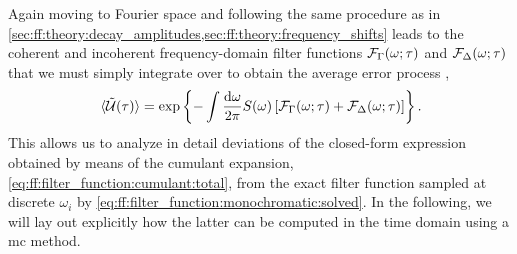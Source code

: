 Again moving to Fourier space and following the same procedure as in \cref{sec:ff:theory:decay_amplitudes,sec:ff:theory:frequency_shifts} leads to the coherent and incoherent frequency-domain filter functions $\mathcal{F}_{\Gamma}(\omega;\tau)$ and $\mathcal{F}_{\Delta}(\omega;\tau)$ that we must simply integrate over to obtain the average error process \liouvUetavg,
\begin{equation}\label{eq:ff:filter_function:cumulant:total}
    \liouvUetavg = \exp\left\lbrace -\int\ddf{\omega}S(\omega)\left[\FF_{\decayamps}(\omega;\tau) + \FF_{\freqshifts}(\omega;\tau)\right]\right\rbrace.
\end{equation}
This allows us to analyze in detail deviations of the closed-form expression obtained by means of the cumulant expansion, \cref{eq:ff:filter_function:cumulant:total}, from the exact filter function sampled at discrete $\omega_i$ by \cref{eq:ff:filter_function:monochromatic:solved}.
In the following, we will lay out explicitly how the latter can be computed in the time domain using a \gls{mc} method.

